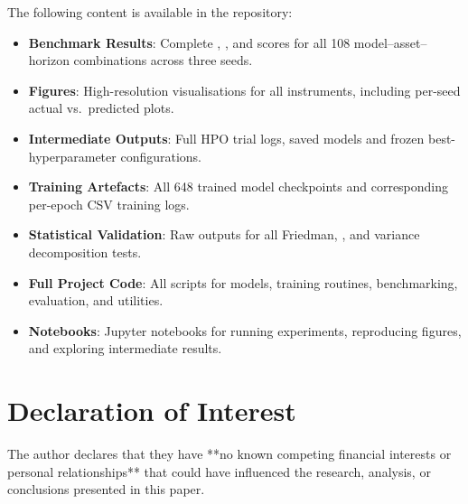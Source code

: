 The following content is available in the repository:
\begin{itemize}
    \item \textbf{Benchmark Results}: Complete \rmse, \mae, and \da scores for all 108 model--asset--horizon combinations across three seeds.
    \item \textbf{Figures}: High-resolution visualisations for all instruments, including per-seed actual vs.\ predicted plots.
    \item \textbf{Intermediate Outputs}: Full HPO trial logs, saved models and frozen best-hyperparameter configurations.
    \item \textbf{Training Artefacts}: All 648 trained model checkpoints and corresponding per-epoch CSV training logs.
    \item \textbf{Statistical Validation}: Raw outputs for all Friedman, \nem, and variance decomposition tests.
    \item \textbf{Full Project Code}: All scripts for models, training routines, benchmarking, evaluation, and utilities.
    \item \textbf{Notebooks}: Jupyter notebooks for running experiments, reproducing figures, and exploring intermediate results.
  \end{itemize}

\section*{Declaration of Interest}
\label{sec:declaration_of_interest}

The author declares that they have **no known competing financial interests or personal relationships** that could have influenced the research, analysis, or conclusions presented in this paper.